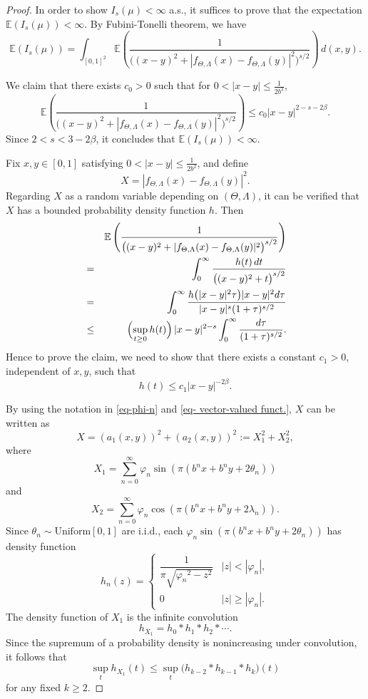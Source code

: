 \documentclass[12pt, reqno]{amsart}
\theoremstyle{plain}
\theoremstyle{definition}
\theoremstyle{remark}
\begin{document}
\begin{proof}
	In order to show $I_s(\mu)<\infty $ a.s., it suffices to prove that the expectation \( \mathbb{E}(I_s(\mu)) < \infty \). By Fubini-Tonelli theorem, we have
	\begin{equation*}
		\mathbb{E}(I_s(\mu))= \int_{[0,1]^2} \mathbb{E}\left(\frac{1}{\bigl((x-y)^2 + |f_{\Theta,\Lambda}(x)-f_{\Theta,\Lambda}(y)|^2\bigr)^{s/2}}\right) \, d(x,y).
	\end{equation*}
	
	We claim that there exists $c_0>0$ such that for \( 0 < |x-y| \le \frac{1}{2b^2} \),  
	$$\mathbb{E}\left(\frac{1}{\bigl((x-y)^2 + |f_{\Theta,\Lambda}(x)-f_{\Theta,\Lambda}(y)|^2\bigr)^{s/2}}\right)\le c_0|x-y|^{2-s-2\beta}.$$
	Since \( 2 < s < 3-2\beta \), it concludes that $\mathbb{E}(I_s(\mu))<\infty$.
	
	Fix \( x,y \in [0,1] \) satisfying \( 0 < |x-y| \le \frac{1}{2b^2}\), and define
	$$X = |f_{\Theta,\Lambda}(x)-f_{\Theta,\Lambda}(y)|^2.$$
	Regarding \( X \) as a random variable depending on \( (\Theta,\Lambda) \), it can be verified that \( X \) has a bounded probability density function \( h \). Then
	\begin{eqnarray*}
			&& \mathbb{E}\left(\frac{1}{\bigl((x-y)^2 + |f_{\Theta,\Lambda}(x)-f_{\Theta,\Lambda}(y)|^2\bigr)^{s/2}}\right) \\
			&= &\int_0^\infty \frac{h(t)\,dt}{\bigl((x-y)^2 + t\bigr)^{s/2}} \\
			&= &\int_0^\infty \frac{h\bigl(|x-y|^2 \tau\bigr) |x-y|^2 d\tau}{|x-y|^s (1+\tau)^{s/2}} \\
			&\le &\Bigl(\sup_{t\ge 0} h(t)\Bigr) \, |x-y|^{2-s} \int_0^\infty \frac{d\tau}{(1+\tau)^{s/2}}.
	\end{eqnarray*}
	 Hence to prove the claim, we need to show that there exists a constant \( c_1>0 \), independent of \( x,y \), such that
	\begin{equation}\label{eq-claim}
	h(t) \le c_1|x-y|^{-2\beta}.
	\end{equation}
	
	By using the notation in \eqref{eq-phi-n} and \eqref{eq- vector-valued funct.}, $X$ can be written as
	$$X = (a_1(x,y))^2 +(a_2(x,y))^2 := X_1^2 + X_2^2,$$
	where    
	   $$X_1 = \sum_{n=0}^\infty  \varphi_n \sin\left(\pi\left(b^n x + b^n y +2\theta_n\right)\right)$$ 
	and 
	   $$X_2 = \sum_{n=0}^\infty  \varphi_n \cos\left(\pi\left(b^n x + b^n y +2\lambda_n\right)\right).$$
   Since \( \theta_n \sim \mathrm{Uniform}[0,1] \) are i.i.d., each \( \varphi_n \sin\left(\pi\left(b^n x + b^n y +2\theta_n\right)\right) \) has density function
	\begin{equation*}
		h_n(z) =
		\begin{cases}
			\dfrac{1}{\pi\sqrt{{\varphi_n}^2-z^2}} & |z| < |\varphi_n|, \\
			0 & |z| \ge |\varphi_n|.
		\end{cases}
	\end{equation*}
 The density function of $X_1$ is the infinite convolution 
 $$h_{X_1} = h_0 * h_1 * h_2 * \cdots.$$ 
 Since the supremum of a probability density is nonincreasing under convolution, it follows that	
	\[
	\sup_t h_{X_1}(t) \le \sup_t \bigl(h_{k-2} * h_{k-1} * h_k\bigr)(t)
	\]
	for any fixed \( k \ge 2 \). 
	

\end{proof}
\end{document}
